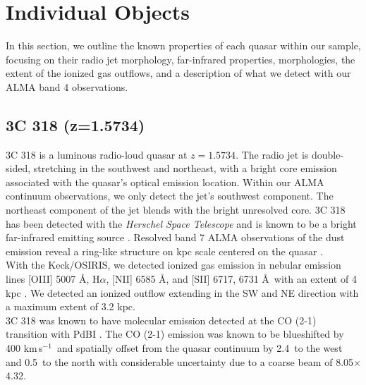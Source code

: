 \documentclass[twocolumn]{aastex63}
\newcommand{\ha}{H$\alpha$\xspace}
\newcommand{\nii}{[N{\sc II}]\xspace}
\newcommand{\oiii}{[O{\sc III}]\xspace}
\newcommand{\sii}{[S{\sc II}]\xspace}
\newcommand{\kms}{km\,s$^{-1}$}
\begin{document}
\section{Individual Objects}\label{sec:indiv_obj}

In this section, we outline the known properties of each quasar within our sample, focusing on their radio jet morphology, far-infrared properties, morphologies, the extent of the ionized gas outflows, and a description of what we detect with our ALMA band 4 observations.

\subsection{3C 318 (z=1.5734)}\label{sec:3c318}

3C 318 is a luminous radio-loud quasar at $z=1.5734$. The radio jet is double-sided, stretching in the southwest and northeast, with a bright core emission associated with the quasar's optical emission location. Within our ALMA continuum observations, we only detect the jet's southwest component. The northeast component of the jet blends with the bright unresolved core. 3C 318 has been detected with the \textit{Herschel Space Telescope} and is known to be a bright far-infrared emitting source \citep{Podigachoski15}. Resolved band 7 ALMA observations of the dust emission reveal a ring-like structure on kpc scale centered on the quasar \citep{Barthel19}.\\

With the Keck/OSIRIS, we detected ionized gas emission in nebular emission lines \oiii 5007 \AA, \ha, \nii 6585 \AA, and \sii 6717, 6731 \AA\ with an extent of 4 kpc \citep{Vayner19b}. We detected an ionized outflow extending in the SW and NE direction with a maximum extent of 3.2 kpc. \\

3C 318 was known to have molecular emission detected at the CO (2-1) transition with PdBI \citep{willott07}. The CO (2-1) emission was known to be blueshifted by 400 \kms\ and spatially offset from the quasar continuum by 2.4\arcsec\ to the west and 0.5\arcsec\ to the north with considerable uncertainty due to a coarse beam of 8.05\arcsec$\times$4.32\arcsec. \\
\end{document}
